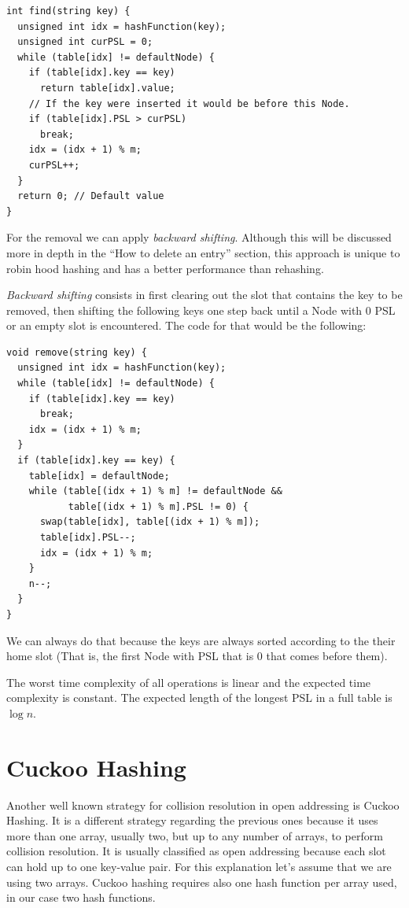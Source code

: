 \newpage

\begin{lstlisting}
int find(string key) {
  unsigned int idx = hashFunction(key);
  unsigned int curPSL = 0;
  while (table[idx] != defaultNode) {
    if (table[idx].key == key) 
      return table[idx].value;
    // If the key were inserted it would be before this Node.
    if (table[idx].PSL > curPSL)
      break; 
    idx = (idx + 1) % m;
    curPSL++;
  }
  return 0; // Default value
}
\end{lstlisting}

For the removal we can apply \textit{backward shifting}. Although this will be discussed more in depth in the ``How to delete an entry'' section, this approach is unique to robin hood hashing and has a better performance than rehashing.

\textit{Backward shifting} consists in first clearing out the slot that contains the key to be removed, then shifting the following keys one step back until a Node with 0 PSL or an empty slot is encountered. The code for that would be the following:

\begin{lstlisting}
void remove(string key) {
  unsigned int idx = hashFunction(key);
  while (table[idx] != defaultNode) {
    if (table[idx].key == key) 
      break;
    idx = (idx + 1) % m;
  }
  if (table[idx].key == key) {
    table[idx] = defaultNode;
    while (table[(idx + 1) % m] != defaultNode &&
           table[(idx + 1) % m].PSL != 0) {
      swap(table[idx], table[(idx + 1) % m]);
      table[idx].PSL--;
      idx = (idx + 1) % m;
    }
    n--;
  }
}
\end{lstlisting}

We can always do that because the keys are always sorted according to the their home slot (That is, the first Node with PSL that is 0 that comes before them).

The worst time complexity of all operations is linear and the expected time complexity is constant. The expected length of the longest PSL in a full table is \( \log n \).
\section{Cuckoo Hashing}

Another well known strategy for collision resolution in open addressing is Cuckoo Hashing. It is a different strategy regarding the previous ones because it uses more than one array, usually two, but up to any number of arrays, to perform collision resolution. It is usually classified as open addressing because each slot can hold up to one key-value pair. For this explanation let's assume that we are using two arrays. Cuckoo hashing requires also one hash function per array used, in our case two hash functions.

